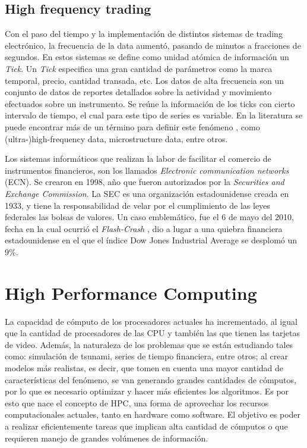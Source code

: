 \subsection{High frequency trading}

Con el paso del tiempo y la implementación de distintos sistemas de trading
electrónico, la frecuencia de la data aumentó, pasando de minutos a fracciones
de segundos.  En estos sistemas se define como unidad atómica de información un
\emph{Tick}. Un \emph{Tick} especifica una gran cantidad de parámetros como la
marca temporal, precio, cantidad transada, etc.  Los datos de alta frecuencia
son un conjunto de datos de reportes detallados sobre la actividad y movimiento
efectuados sobre un instrumento. Se reúne la información de los ticks con
cierto intervalo de tiempo, el cual para este tipo de series es variable. En la
literatura se puede encontrar más de un término para definir este fenómeno
\cite{ei2007quantitative}, como (ultra-)high-frequency data, microstructure
data, entre otros.

Los sistemas informáticos que realizan la labor de facilitar el comercio de
instrumentos financieros, son los llamados \emph{Electronic communication
networks} (ECN).  Se crearon en 1998, año que fueron autorizados por la
\emph{Securities and Exchange Commission}. La SEC \cite{hasbrouck2004economic}
es una organización estadounidense creada en 1933, y tiene la responsabilidad
de velar por el cumplimiento de las leyes federales las bolsas de valores. Un
caso emblemático, fue el 6 de mayo del 2010, fecha en la cual ocurrió el
\emph{Flash-Crash} \cite{arndt2011high}, dio a lugar a una quiebra financiera
estadounidense en el que el índice Dow Jones Industrial Average se desplomó un
9\%.

\section{High Performance Computing}

La capacidad de cómputo de los procesadores actuales ha incrementado, al igual
que la cantidad de procesadores de las CPU y también las que tienen las
tarjetas de video. Además, la naturaleza de los problemas que se están
estudiando tales como: simulación de tsunami, series de tiempo financiera,
entre otros; al crear modelos más realistas, es decir, que tomen en cuenta una
mayor cantidad de características del fenómeno, se van generando grandes
cantidades de cómputos, por lo que es necesario optimizar y hacer más
eficientes los algoritmos. Es por esto que nace el concepto de HPC, una forma
de aprovechar los recursos computacionales actuales, tanto en hardware como
software. El objetivo es poder a realizar eficientemente tareas que implican
alta cantidad de cómputos o que requieren manejo de grandes volúmenes de
información. 

